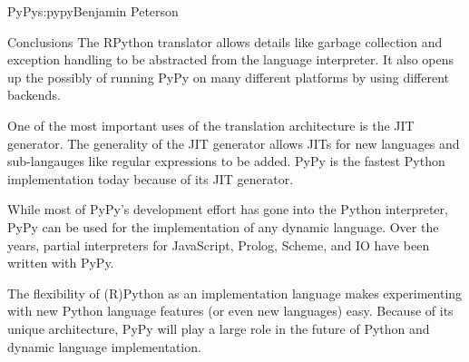 \begin{aosachapter}{PyPy}{s:pypy}{Benjamin Peterson}
\begin{aosasect1}{Conclusions}
The RPython translator allows details like garbage collection and exception
handling to be abstracted from the language interpreter. It also opens up the
possibly of running PyPy on many different platforms by using different
backends.

One of the most important uses of the translation architecture is the JIT
generator. The generality of the JIT generator allows JITs for new languages and
sub-langauges like regular expressions to be added. PyPy is the fastest Python
implementation today because of its JIT generator.

While most of PyPy's development effort has gone into the Python interpreter,
PyPy can be used for the implementation of any dynamic language. Over the years,
partial interpreters for JavaScript, Prolog, Scheme, and IO have been written
with PyPy.

The flexibility of (R)Python as an implementation language makes experimenting
with new Python language features (or even new languages) easy. Because of its
unique architecture, PyPy will play a large role in the future of Python and
dynamic language implementation.

\end{aosasect1}

\end{aosachapter}
